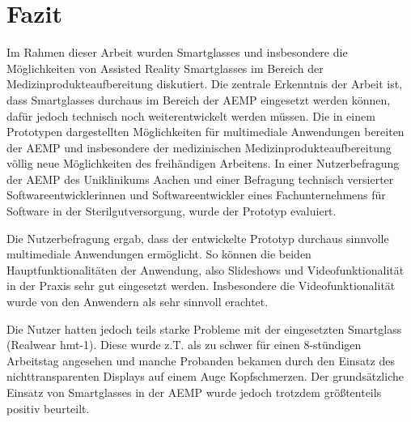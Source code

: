 %
%
%
%
%
%
\chapter{Fazit}
\label{ch:Fazit}

Im Rahmen dieser Arbeit wurden Smartglasses und insbesondere die Möglichkeiten von Assisted Reality Smartglasses im Bereich der Medizinprodukteaufbereitung diskutiert. Die zentrale Erkenntnis der Arbeit ist, dass Smartglasses durchaus im Bereich der AEMP eingesetzt werden können, dafür jedoch technisch noch weiterentwickelt werden müssen. Die in einem Prototypen dargestellten Möglichkeiten für multimediale Anwendungen bereiten der AEMP und insbesondere der medizinischen Medizinprodukteaufbereitung völlig neue Möglichkeiten des freihändigen Arbeitens. In einer Nutzerbefragung der AEMP des Uniklinikums Aachen und einer Befragung technisch versierter  Softwareentwicklerinnen und Softwareentwickler eines Fachunternehmens für Software in der Sterilgutversorgung, wurde der Prototyp evaluiert.

Die Nutzerbefragung ergab, dass der entwickelte Prototyp durchaus sinnvolle multimediale Anwendungen ermöglicht. So können die beiden Hauptfunktionalitäten der Anwendung, also Slideshows und Videofunktionalität in der Praxis sehr gut eingesetzt werden. Insbesondere die Videofunktionalität wurde von den Anwendern als sehr sinnvoll erachtet. 

Die Nutzer hatten jedoch teils starke Probleme mit der eingesetzten Smartglass (Realwear hmt-1). Diese wurde z.T. als zu schwer für einen 8-stündigen Arbeitstag angesehen und manche Probanden bekamen durch den Einsatz des nichttransparenten Displays auf einem Auge Kopfschmerzen. Der grundsätzliche Einsatz von Smartglasses in der AEMP wurde jedoch trotzdem größtenteils positiv beurteilt.
%
